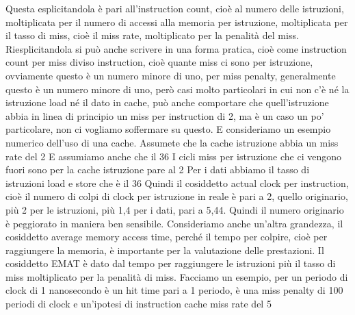 Questa esplicitandola è pari all'instruction count, cioè al numero delle istruzioni, moltiplicata per il numero di accessi alla memoria per istruzione, moltiplicata per il tasso di miss, cioè il miss rate, moltiplicato per la penalità del miss.
Riesplicitandola si può anche scrivere in una forma pratica, cioè come instruction count per miss diviso instruction, cioè quante miss ci sono per istruzione, ovviamente questo è un numero minore di uno, per miss penalty, generalmente questo è un numero minore di uno, però casi molto particolari in cui non c'è né la istruzione load né il dato in cache, può anche comportare che quell'istruzione abbia in linea di principio un miss per instruction di 2, ma è un caso un po' particolare, non ci vogliamo soffermare su questo.
E consideriamo un esempio numerico dell'uso di una cache.
Assumete che la cache istruzione abbia un miss rate del 2%
E assumiamo anche che il 36%
I cicli miss per istruzione che ci vengono fuori sono per la cache istruzione pare al 2%
Per i dati abbiamo il tasso di istruzioni load e store che è il 36%
Quindi il cosiddetto actual clock per instruction, cioè il numero di colpi di clock per istruzione in reale è pari a 2, quello originario, più 2 per le istruzioni, più 1,4 per i dati, pari a 5,44.
Quindi il numero originario è peggiorato in maniera ben sensibile.
Consideriamo anche un'altra grandezza, il cosiddetto average memory access time, perché il tempo per colpire, cioè per raggiungere la memoria, è importante per la valutazione delle prestazioni.
Il cosiddetto EMAT è dato dal tempo per raggiungere le istruzioni più il tasso di miss moltiplicato per la penalità di miss.
Facciamo un esempio, per un periodo di clock di 1 nanosecondo è un hit time pari a 1 periodo, è una miss penalty di 100 periodi di clock e un'ipotesi di instruction cache miss rate del 5%
